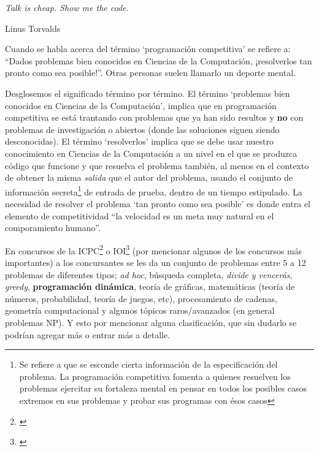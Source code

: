 \label{chap:prog_competitiva}
\epigraph{\itshape Talk is cheap. Show me the code.}{Linus Torvalds}

Cuando se habla acerca del término `programación competitiva' se refiere a: ``Dados problemas
bien conocidos en Ciencias de la Computación, ¡resolverlos tan pronto como sea posible!''.
\cite{halim2013competitive} Otras personas suelen llamarlo un deporte mental.

Desglosemos el significado término por término. El término `problemas bien conocidos en Ciencias de
la Computación', implica que en programación competitiva se está trantando con problemas que
ya han sido resultos y \textbf{no} con problemas de investigación o abiertos (donde las
soluciones siguen siendo desconocidas). El término `resolverlos' implica que se debe usar nuestro
conocimiento en Ciencias de la Computación a un nivel en el que se produzca código que funcione y
que resuelva el problema también, al menos en el contexto de obtener la misma \textit{salida} que
el autor del problema, usando el conjunto de información secreta\footnote{
    Se refiere a que se esconde cierta información de la especificación del problema. La
    programación competitiva fomenta a quienes resuelven los problemas ejercitar su fortaleza
    mental en pensar en todos los posibles casos extremos en sus problemas y probar sus programas
    con ésos casos}
de entrada de prueba, dentro de un tiempo estipulado. La necesidad de resolver el problema `tan
pronto como sea posible' es donde entra el elemento de competitividad ``la velocidad es un
meta muy natural en el comporamiento humano''. \par

En concursos de la ICPC\footnote{
    \cite{eswiki:135765381}
} o IOI\footnote{
    \cite{eswiki:125950903}
} (por mencionar algunos de los concursos más importantes) a los concursantes se les da un conjunto
de problemas entre 5 a 12 problemas de diferentes tipos; \emph{ad hoc}, búsqueda
completa, \emph{divide y vencerás}, \emph{greedy}, \textbf{programación dinámica}, teoría
de gráficas, matemáticas (teoría de números, probabilidad, teoría de juegos, etc), procesamiento
de cadenas, geometría computacional y algunos tópicos raros/avanzados (en general problemas NP).
Y esto por mencionar alguna clasificación, que sin dudarlo se podrían agregar más o entrar más a
detalle.

